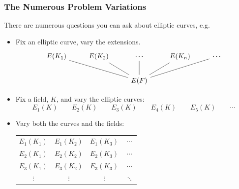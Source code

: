 
\begin{frame}[plain] \frametitle{The Numerous Problem Variations} \footnotesize
There are numerous questions you can ask about elliptic curves, e.g.
\begin{itemize}
\item Fix an elliptic curve, vary the extensions.
	\[
	\begin{tikzcd}[ampersand replacement=\&]
	E(K_1) \& E(K_2) \& \cdots \& E(K_n) \& \cdots \\
	\& \& E(F) \arrow[dash]{ull} \arrow[dash]{ul} \arrow[dash]{u} \arrow[dash]{ur} \arrow[dash]{urr} \& \& 
	\end{tikzcd}
	\]

\item Fix a field, $K$, and vary the elliptic curves:
	\[
	E_1(K) \qquad E_2(K) \qquad E_3(K) \qquad E_4(K) \qquad E_5(K) \qquad \cdots 
	\]

\item Vary both the curves and the fields:
	\begin{table}[ht]
	\centering
	\begin{tabular}{cccc}
	$E_1(K_1)$ & $E_1(K_2)$ & $E_1(K_3)$ & $\cdots$ \\
	$E_2(K_1)$ & $E_2(K_2)$ & $E_2(K_3)$ & $\cdots$ \\
	$E_3(K_1)$ & $E_3(K_2)$ & $E_3(K_3)$ & $\cdots$ \\
	$\vdots$ & $\vdots$ & $\vdots$ & $\ddots$
	\end{tabular}
	\end{table}
\end{itemize}
\end{frame}

